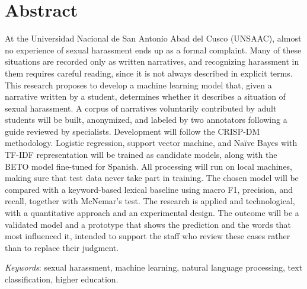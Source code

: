\chapter*{Abstract}

\noindent At the Universidad Nacional de San Antonio Abad del Cusco (UNSAAC), almost no experience of sexual harassment ends up as a formal complaint. Many of these situations are recorded only as written narratives, and recognizing harassment in them requires careful reading, since it is not always described in explicit terms. This research proposes to develop a machine learning model that, given a narrative written by a student, determines whether it describes a situation of sexual harassment. A corpus of narratives voluntarily contributed by adult students will be built, anonymized, and labeled by two annotators following a guide reviewed by specialists. Development will follow the CRISP-DM methodology. Logistic regression, support vector machine, and Naïve Bayes with TF-IDF representation will be trained as candidate models, along with the BETO model fine-tuned for Spanish. All processing will run on local machines, making sure that test data never take part in training. The chosen model will be compared with a keyword-based lexical baseline using macro F1, precision, and recall, together with McNemar's test. The research is applied and technological, with a quantitative approach and an experimental design. The outcome will be a validated model and a prototype that shows the prediction and the words that most influenced it, intended to support the staff who review these cases rather than to replace their judgment.

\vspace{0.5em}
\noindent\textit{Keywords}: sexual harassment, machine learning, natural language processing, text classification, higher education.

